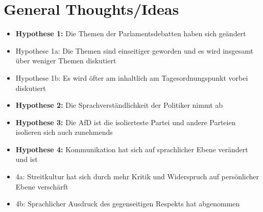\section{General Thoughts/Ideas}

\begin{itemize} 
\item [] {\bfseries Hypothese 1:} 
Die Themen der Parlamentsdebatten haben sich geändert
\item  Hypothese 1a: Die Themen sind einseitiger geworden und es wird insgesamt über weniger Themen diskutiert
\item  Hypothese 1b: Es wird öfter am inhaltlich am Tagesordnungspunkt vorbei diskutiert 
\item [] {\bfseries Hypothese 2:} 
Die Sprachverständlichkeit der Politiker nimmt ab
\item [] {\bfseries Hypothese 3:} 
Die AfD ist die isolierteste Partei und andere Parteien isolieren sich auch zunehmends 
\item [] {\bfseries Hypothese 4:} 
Kommunikation hat sich auf sprachlicher Ebene verändert und ist
\item[] 4a: Streitkultur hat sich durch mehr Kritik und Widerspruch auf persönlicher Ebene verschärft
\item[] 4b: Sprachlicher Ausdruck des gegenseitigen Respekts hat abgenommen 

\end{itemize}






\newpage